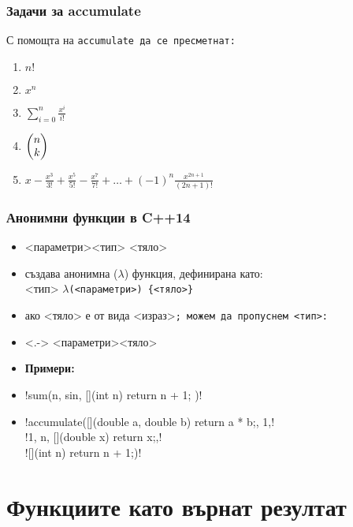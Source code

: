 \documentclass{beamer}
\begin{document}
\begin{frame}
  \frametitle{Задачи за accumulate}
  С помощта на \tt{accumulate} да се пресметнат:

  \begin{enumerate}[<+->]
  \item $n!$
  \item $x^n$
  \item $\displaystyle\sum_{i=0}^n \frac{x^i}{i!}$
  \item $\displaystyle\left(\begin{array}{@{}c@{}}n\\k\end{array}\right)$
  \item $\displaystyle x - \frac{x^3}{3!} + \frac{x^5}{5!} - \frac{x^7}{7!} + \ldots + (-1)^n\frac{x^{2n+1}}{(2n+1)!}$
  \end{enumerate}
\end{frame}

\begin{frame}[fragile]
  \frametitle{Анонимни функции в C++14}
  \begin{itemize}[<+->]
  \item \tta{[](}<параметри>\tta{) -> }<тип> \tta{\{}<тяло>\tta{\}}
  \item създава анонимна ($\lambda$) функция, дефинирана като:\\
    <тип> $\lambda$\tt(<параметри>\tt{) \{}<тяло>\tt\}
  \item ако <тяло> е от вида <израз>\tt; можем да пропуснем <тип>:
  \item<.-> \tta{[](}<параметри>\tta{) \{}<тяло>\tta{\}}
  \item \textbf{Примери:}
  \item \lst!sum(n, sin, [](int n) { return n + 1; })!
  \item \lst!accumulate([](double a, double b) { return a * b;}, 1,!\\
    \hspace{13ex}\lst!1, n, [](double x) {return x;},!\\
    \hspace{13ex}\lst![](int n) { return n + 1;})!
  \end{itemize}
\end{frame}

\section{Функциите като върнат резултат}
\end{document}
